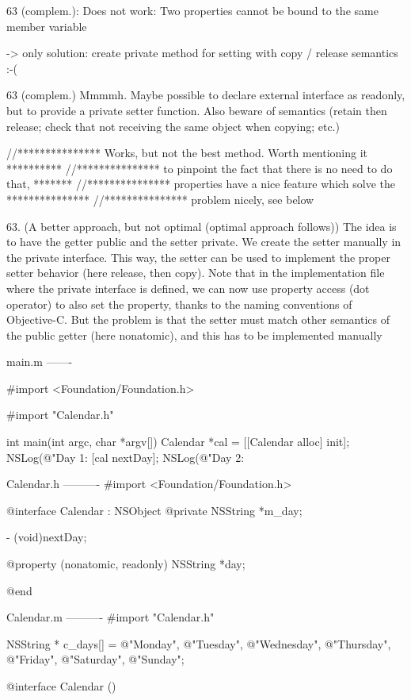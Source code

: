63 (complem.): Does not work: Two properties cannot be bound to the same
member variable

-> only solution: create private method for setting with copy / release
semantics :-(

63 (complem.) Mmmmh. Maybe possible to declare external interface as
readonly, but to provide a private setter function. Also beware of semantics
(retain then release; check that not receiving the same object when copying;
etc.)

//*************** Works, but not the best method. Worth mentioning it **********
//*************** to pinpoint the fact that there is no need to do that, *******
//*************** properties have a nice feature which solve the ***************
//*************** problem nicely, see below

63. (A better approach, but not optimal (optimal approach follows)) The idea
is to have the getter public and the setter private. We create the setter
manually in the private interface. This way, the setter can be used to
implement the proper setter behavior (here release, then copy). Note that in
the implementation file where the private interface is defined, we can now
use property access (dot operator) to also set the property, thanks to the
naming conventions of Objective-C. But the problem is that the setter must
match other semantics of the public getter (here nonatomic), and this has to
be implemented manually

main.m
-------

#import <Foundation/Foundation.h>

#import "Calendar.h"

int main(int argc, char *argv[])
{
 Calendar *cal = [[Calendar alloc] init];
 NSLog(@"Day 1: %
 [cal nextDay];
 NSLog(@"Day 2: %
}

Calendar.h
----------
#import <Foundation/Foundation.h>

@interface Calendar : NSObject {
@private
 NSString *m_day;
}

- (void)nextDay;

@property (nonatomic, readonly) NSString *day;

@end

Calendar.m
----------
#import "Calendar.h"

NSString * c_days[] = {@"Monday", @"Tuesday", @"Wednesday", @"Thursday",
@"Friday", @"Saturday", @"Sunday"};

@interface Calendar ()

